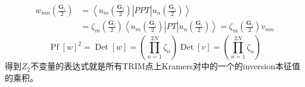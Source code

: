 \documentclass[10pt,openany]{book}
\theoremstyle{thmstyle} %
\theoremstyle{defstyle} %
\theoremstyle{prostyle} %
\begin{document}
\begin{equation}
  \begin{aligned}
    w_{m n}\left(\frac{\mathbf{G}_i}{2}\right) & =\left\langle u_m\left(\frac{\mathbf{G}_i}{2}\right)\right| P P T\left|u_n\left(\frac{\mathbf{G}_i}{2}\right)\right\rangle \\
    & =\zeta_m\left(\frac{\mathbf{G}_i}{2}\right)\left\langle u_m\left(\frac{\mathbf{G}_i}{2}\right)\right| P T\left|u_n\left(\frac{\mathbf{G}_i}{2}\right)\right\rangle=\zeta_m\left(\frac{\mathbf{G}_i}{2}\right) v_{m n}
    \end{aligned}
\end{equation}
\begin{equation}
  \operatorname{Pf}[w]^2=\operatorname{Det}[w]=\left(\prod_{n=1}^{2 N} \zeta_n\right) \operatorname{Det}[v]=\left(\prod_{n=1}^{2 N} \zeta_n\right)
\end{equation}
得到$Z_2$不变量的表达式就是所有TRIM点上Kramers对中的一个的inversion本征值的乘积。
\end{document}
